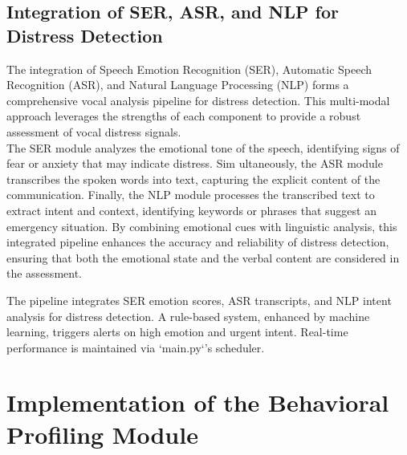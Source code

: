 \documentclass[12pt,a4paper,oneside,english]{book}
\begin{document}
{\subsection{Integration of SER, ASR, and NLP for Distress Detection}%
\label{integration_ser_asr_nlp}
The integration of Speech Emotion Recognition (SER), Automatic Speech Recognition (ASR), and Natural Language Processing (NLP) forms a comprehensive vocal analysis pipeline for distress detection.
This multi-modal approach leverages the strengths of each component to provide a robust assessment of vocal distress signals.
\\The SER module analyzes the emotional tone of the speech, identifying signs of fear or anxiety that may indicate distress.
Sim ultaneously, the ASR module transcribes the spoken words into text, capturing the explicit content of the communication.
Finally, the NLP module processes the transcribed text to extract intent and context, identifying keywords or phrases that suggest an emergency situation.
By combining emotional cues with linguistic analysis, this integrated pipeline enhances the accuracy and reliability of distress detection, ensuring that both the emotional state and the verbal content are considered in the assessment.


The pipeline integrates SER emotion scores, ASR transcripts, and NLP intent analysis for distress detection. A rule-based system, enhanced by machine learning, triggers alerts on high 
emotion and urgent intent. Real-time performance is maintained via `main.py`'s scheduler.








\section{Implementation of the Behavioral Profiling Module} %
}
\end{document}
